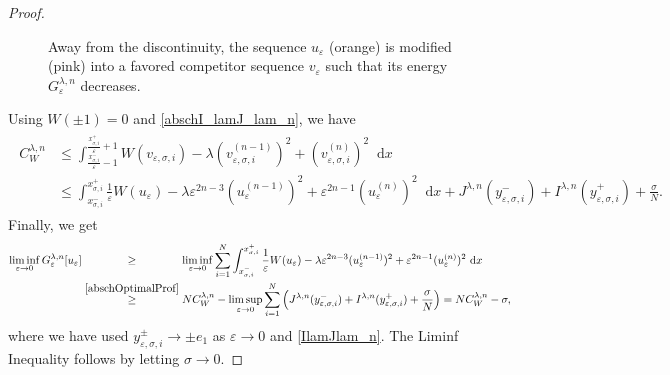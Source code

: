 \documentclass{article}
\newcommand{\dd}{\mathop{}\mathrm{d}} %
\newcommand{\lam}{\lambda}
\newcommand{\eps}{\varepsilon}
\numberwithin{figure}{section}
\numberwithin{equation}{section}
\begin{document}
\begin{proof}
\begin{figure}[htb]
\caption{Away from the discontinuity, the sequence $u_\eps$ (orange) is modified (pink) into a favored competitor sequence $v_\eps$ such that its energy $G_\eps^{\lam,n}$ decreases.}
\end{figure}
    \vspace{12pt}
        
    \noindent Using $W(\pm 1)=0$ and \eqref{abschI_lamJ_lam_n}, we have     
    \begin{align} \label{abschOptimalProf}
    \begin{split}
        C^{\lam,n}_W & \leq \int_{\frac{x_{\sigma,i}^-}{\eps} -1}^{\frac{x_{\sigma,i}^+}{\eps} +1} W(v_{\eps,\sigma,i})-\lam(v^{(n-1)}_{\eps,\sigma,i})^2+(v^{(n)}_{\eps,\sigma,i})^2\dd x\\
        & \leq \int_{x_{\sigma,i}^-}^{x_{\sigma,i}^+} \frac 1\eps W(u_\eps)-\lam \eps^{2n-3} (u^{(n-1)}_\eps)^2 + \eps^{2n-1}(u^{(n)}_\eps)^2\dd x + J^{\lam,n}(y^-_{\eps,\sigma,i}) + I^{\lam,n}(y^+_{\eps,\sigma,i}) + \frac \sigma N.
    \end{split}
    \end{align}
    Finally, we get
    \begin{align}
        \liminf_{\eps \to 0} G_\eps^{\lam,n}[u_\eps] & \overset{\hphantom{\eqref{abschOptimalProf}}}{\geq} \liminf_{\eps \to 0} \sum_{i=1}^N \int_{x_{\sigma,i}^-}^{x_{\sigma,i}^+} \frac 1\eps W(u_\eps)-\lam \eps^{2n-3} (u^{(n-1)}_\eps)^2 + \eps^{2n-1}(u^{(n)}_\eps)^2\dd x \\
        & \overset{\eqref{abschOptimalProf}}{\geq} N C_W^{\lam,n} - \limsup_{\eps \to 0} \sum_{i=1}^N \left( J^{\lam,n}(y^-_{\eps,\sigma,i}) + I^{\lam,n}(y^+_{\eps,\sigma,i}) + \frac \sigma N \right) = N C^{\lam,n}_W - \sigma,
    \end{align}
    where we have used $y_{\eps,\sigma,i}^\pm \to \pm e_1$ as $\eps \to 0$ and \eqref{IlamJlam_n}. The Liminf Inequality follows by letting $\sigma \to 0$.
    \end{proof}
\end{document}
